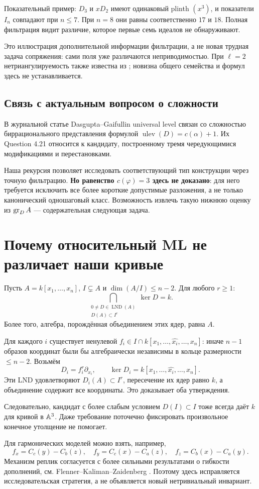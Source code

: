 Показательный пример: $D_3$ и $xD_2$ имеют одинаковый plinth $(x^3)$, и показатели $I_n$ совпадают при $n\le7$. При $n=8$ они равны соответственно $17$ и $18$. Полная фильтрация видит различие, которое первые семь идеалов не обнаруживают.

Это иллюстрация дополнительной информации фильтрации, а не новая трудная
задача сопряжения: сами поля уже различаются неприводимостью.
При $\ell=2$ нетриангулируемость также известна из
\cite[Example 4.19]{DG}; новизна общего семейства и формул здесь
не устанавливается.

\subsection*{Связь с актуальным вопросом о сложности}
В журнальной статье Dasgupta--Gaifullin \cite[Theorem 4.12]{DG} universal level связан со сложностью биррационального представления формулой $\operatorname{ulev}(D)=c(\alpha)+1$. Их Question 4.21 относится к кандидату, построенному тремя чередующимися модификациями и перестановками.

Наша рекурсия позволяет исследовать соответствующий тип конструкции через точную фильтрацию. \textbf{Но равенство $c(\varphi)=3$ здесь не доказано}: для него требуется исключить все более короткие допустимые разложения, а не только канонический одношаговый класс. Возможность извлечь такую нижнюю оценку из $\operatorname{gr}_DA$ --- содержательная следующая задача.

\section{Почему относительный ML не различает наши кривые}\label{sec:relativeML}
Пусть $A=k[x_1,\ldots,x_n]$, $I\subsetneq A$ и $\dim(A/I)\le n-2$. Для любого $r\ge1$:
\[
\boxed{\bigcap_{\substack{0\ne D\in\operatorname{LND}(A)\\D(A)\subset I^r}}\ker D=k.}
\]
Более того, алгебра, порождённая объединением этих ядер, равна $A$.

Для каждого $i$ существует ненулевой $f_i\in I\cap k[x_1,\ldots,\widehat{x_i},\ldots,x_n]$: иначе $n-1$ образов координат были бы алгебраически независимы в кольце размерности $\le n-2$. Возьмём
\[
D_i=f_i^r\partial_{x_i},\qquad
\ker D_i=k[x_1,\ldots,\widehat{x_i},\ldots,x_n].
\]
Эти LND удовлетворяют $D_i(A)\subset I^r$, пересечение их ядер равно $k$, а объединение содержит все координаты. Это доказывает оба утверждения.

Следовательно, кандидат с более слабым условием $D(I)\subset I$ тоже всегда даёт $k$ для кривой в ${\mathbb{A}}^3$. Даже требование поточечно фиксировать произвольное конечное утолщение не помогает.

Для гармонических моделей можно взять, например,
\[
f_x=C_c(y)-C_b(z),\quad
f_y=C_c(x)-C_a(z),\quad
f_z=C_b(x)-C_a(y).
\]
Механизм реплик согласуется с более сильными результатами о гибкости дополнений, см. Flenner--Kaliman--Zaidenberg \cite{FKZ}. Поэтому здесь исправляется исследовательская стратегия, а не объявляется новый нетривиальный инвариант.

